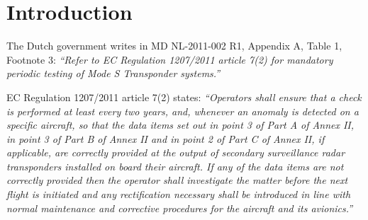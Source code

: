 \documentclass[a4paper]{article}
\begin{document}
\section{Introduction}
The Dutch government writes in MD NL-2011-002 R1\cite{NL_2011_002_R1}, Appendix A, Table 1, Footnote 3: \emph{``Refer to EC Regulation 1207/2011 article 7(2) for mandatory periodic testing of Mode S Transponder systems.''}

EC Regulation 1207/2011\cite{EC_1207_2011} article 7(2) states: \emph{``Operators shall ensure that a check is performed at least every two years, and, whenever an anomaly is detected on a specific aircraft, so that the data items set out in point 3 of Part A of Annex II, in point 3 of Part B of Annex II and in point 2 of Part C of Annex II, if applicable, are correctly provided at the output of secondary surveillance radar transponders installed on board their aircraft. If any of the data items are not correctly provided then the operator shall investigate the matter before the next flight is initiated and any rectification necessary shall be introduced in line with normal maintenance and corrective procedures for the aircraft and its avionics.''}
\end{document}
